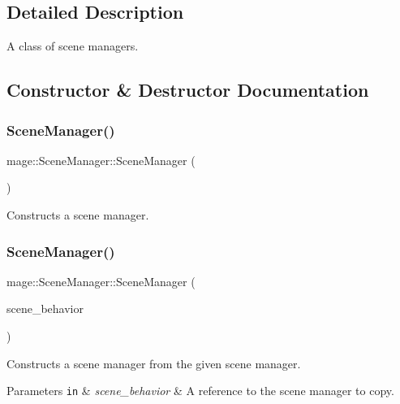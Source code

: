 \subsection{Detailed Description}
A class of scene managers. 

\subsection{Constructor \& Destructor Documentation}
\hypertarget{classmage_1_1_scene_manager_a25a1185ca41db52d046a5901b301a0be}{}\label{classmage_1_1_scene_manager_a25a1185ca41db52d046a5901b301a0be} 
\subsubsection{\texorpdfstring{Scene\+Manager()}{SceneManager()}\hspace{0.1cm}{\footnotesize\ttfamily [1/3]}}
{\footnotesize\ttfamily mage\+::\+Scene\+Manager\+::\+Scene\+Manager (\begin{DoxyParamCaption}{ }\end{DoxyParamCaption})}

Constructs a scene manager. \hypertarget{classmage_1_1_scene_manager_a450ce8e4d52483a2dcc3bb090f565373}{}\label{classmage_1_1_scene_manager_a450ce8e4d52483a2dcc3bb090f565373} 
\subsubsection{\texorpdfstring{Scene\+Manager()}{SceneManager()}\hspace{0.1cm}{\footnotesize\ttfamily [2/3]}}
{\footnotesize\ttfamily mage\+::\+Scene\+Manager\+::\+Scene\+Manager (\begin{DoxyParamCaption}\item[{const \hyperlink{classmage_1_1_scene_manager}{Scene\+Manager} \&}]{scene\+\_\+behavior }\end{DoxyParamCaption})\hspace{0.3cm}{\ttfamily [delete]}}

Constructs a scene manager from the given scene manager.


\begin{DoxyParams}[1]{Parameters}
\mbox{\tt in}  & {\em scene\+\_\+behavior} & A reference to the scene manager to copy. \\
\hline
\end{DoxyParams}
\hypertarget{classmage_1_1_scene_manager_ae8f4c6553e27b0bc00f0ea40f0e3770c}{}\label{classmage_1_1_scene_manager_ae8f4c6553e27b0bc00f0ea40f0e3770c} 
